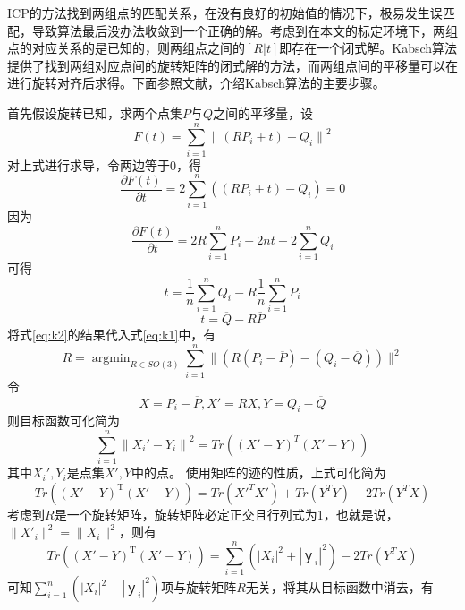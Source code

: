 ICP的方法找到两组点的匹配关系，在没有良好的初始值的情况下，极易发生误匹配，导致算法最后没办法收敛到一个正确的解。考虑到在本文的标定环境下，两组点的对应关系的是已知的，则两组点之间的$[R|t]$即存在一个闭式解。Kabsch算法提供了找到两组对应点间的旋转矩阵的闭式解的方法，而两组点间的平移量可以在进行旋转对齐后求得。下面参照文献，介绍Kabsch算法的主要步骤。

首先假设旋转已知，求两个点集$P$与$Q$之间的平移量，设
\begin{equation}
    F(t) = \sum_{i=1}^n{\|(RP_i + t)-Q_i \|}^2
    \label{eq:k1}
\end{equation}
对上式进行求导，令两边等于0，得
\begin{equation}
    \frac{\partial F(t)}{\partial t}=2\sum_{i=1}^n{((RP_i + t)-Q_i)}=0
\end{equation}
因为
\begin{equation}
    \frac{\partial F(t)}{\partial t}=2R\sum_{i=1}^n{P_i} +2nt - 2\sum_{i=1}^n{Q_i}
\end{equation}
可得
\begin{equation}
    t = \frac{1}{n}\sum_{i=1}^n{Q_i}-R\frac{1}{n}\sum_{i=1}^n{P_i}
\end{equation}
\begin{equation}
    t = \overline{Q}-R\overline{P}
    \label{eq:k2}
\end{equation}
将式\ref{eq:k2}的结果代入式\ref{eq:k1}中，有
\begin{equation}
    R = \mathop{\arg\min}_{R \in SO(3)} \sum_{i=1}^n\|(R(P_i - \overline{P})-(Q_i - \overline{Q}))\|^2
\end{equation}
令
$$
    X = P_i - \overline{P}, X' = RX, Y= Q_i - \overline{Q}
$$
则目标函数可化简为
\begin{equation}
    \sum_{i=1}^n {\|X_i' - Y_i\|}^2=Tr((X'-Y)^T(X'-Y))
\end{equation}
其中$X_i', Y_i$是点集$X', Y$中的点。
使用矩阵的迹的性质，上式可化简为
\begin{equation}
    Tr((X'-Y)^\mathrm{T}(X'-Y)) = Tr({X'}^{T}X') + Tr(Y^{T}Y) - 2Tr(Y^{T}X)
\end{equation}
考虑到$R$是一个旋转矩阵，旋转矩阵必定正交且行列式为1，也就是说，$\|{X'}_i\|^2 = \|X_i\|^2 $，则有
\begin{equation}
    Tr((X'-Y)^\mathrm{T}(X'-Y)) = \sum_{i=1}^n {(|X_i|^2 +|ｙ_i|^2)}- 2Tr(Y^{T}X)
\end{equation}
可知$\sum_{i=1}^n {(|X_i|^2 +|ｙ_i|^2)}$项与旋转矩阵$R$无关，将其从目标函数中消去，有
